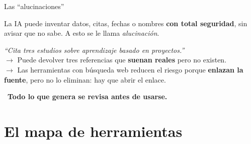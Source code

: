 \documentclass[aspectratio=169,10pt]{beamer}
\begin{document}
\begin{frame}{Las ``alucinaciones''}
\begin{warnbox}
La IA puede inventar datos, citas, fechas o nombres \textbf{con total seguridad}, sin avisar que no sabe. A esto se le llama \emph{alucinación}.
\end{warnbox}
\vspace{8pt}
\begin{center}
\begin{tcolorbox}[enhanced,colback=white,colframe=Dp!40,arc=2mm,width=0.9\textwidth]
\small\emph{``Cita tres estudios sobre aprendizaje basado en proyectos.''}\\[4pt]
$\rightarrow$ Puede devolver tres referencias que \textbf{suenan reales} pero no existen.\\[4pt]
$\rightarrow$ Las herramientas con búsqueda web reducen el riesgo porque \textbf{enlazan la fuente}, pero no lo eliminan: hay que abrir el enlace.
\end{tcolorbox}
\end{center}
\vspace{8pt}
\begin{center}
\large\color{Dp}\faSearch\ \color{Wm}\textbf{Todo lo que genera se revisa antes de usarse.}
\end{center}
\end{frame}

\section{El mapa de herramientas}
\end{document}
